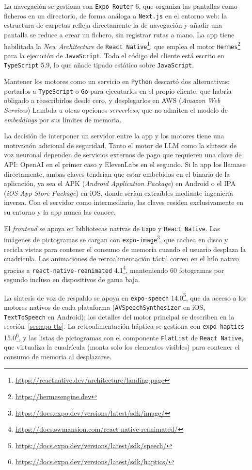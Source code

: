 La navegación se gestiona con \texttt{Expo Router} 6, que organiza las pantallas como ficheros en un directorio, de forma análoga a \texttt{Next.js} en el entorno web: la estructura de carpetas refleja directamente la de navegación y añadir una pantalla se reduce a crear un fichero, sin registrar rutas a mano. La app tiene habilitada la \textit{New Architecture} de \texttt{React Native}\footnote{\url{https://reactnative.dev/architecture/landing-page}}, que emplea el motor \texttt{Hermes}\footnote{\url{https://hermesengine.dev}} para la ejecución de \texttt{JavaScript}. Todo el código del cliente está escrito en \texttt{TypeScript} 5.9, lo que añade tipado estático sobre \texttt{JavaScript}.

Mantener los motores como un servicio en \texttt{Python} descartó dos alternativas: portarlos a \texttt{TypeScript} o \texttt{Go} para ejecutarlos en el propio cliente, que habría obligado a reescribirlos desde cero, y desplegarlos en AWS (\textit{Amazon Web Services}) Lambda u otras opciones \textit{serverless}, que no admiten el modelo de \textit{embeddings} por sus límites de memoria.

La decisión de interponer un servidor entre la app y los motores tiene una motivación adicional de seguridad. Tanto el motor de LLM como la síntesis de voz neuronal dependen de servicios externos de pago que requieren una clave de API: OpenAI en el primer caso y ElevenLabs en el segundo. Si la app los llamase directamente, ambas claves tendrían que estar embebidas en el binario de la aplicación, ya sea el APK (\textit{Android Application Package}) en Android o el IPA (\textit{iOS App Store Package}) en iOS, donde serían extraíbles mediante ingeniería inversa. Con el servidor como intermediario, las claves residen exclusivamente en su entorno y la app nunca las conoce.

El \textit{frontend} se apoya en bibliotecas nativas de \texttt{Expo} y \texttt{React Native}. Las imágenes de pictogramas se cargan con \texttt{expo-image}\footnote{\url{https://docs.expo.dev/versions/latest/sdk/image/}}, que cachea en disco y recicla vistas para contener el consumo de memoria cuando el usuario desplaza la cuadrícula. Las animaciones de retroalimentación táctil corren en el hilo nativo gracias a \texttt{react-native-reanimated} 4.1\footnote{\url{https://docs.swmansion.com/react-native-reanimated/}}, manteniendo 60 fotogramas por segundo incluso en dispositivos de gama baja.

La síntesis de voz de respaldo se apoya en \texttt{expo-speech} 14.0\footnote{\url{https://docs.expo.dev/versions/latest/sdk/speech/}}, que da acceso a los motores nativos de cada plataforma (\texttt{AVSpeechSynthesizer} en iOS, \texttt{TextToSpeech} en Android); los detalles del motor principal se describen en la sección~\ref{sec:app-tts}. La retroalimentación háptica se gestiona con \texttt{expo-haptics} 15.0\footnote{\url{https://docs.expo.dev/versions/latest/sdk/haptics/}}, y las listas de pictogramas con el componente \texttt{FlatList} de \texttt{React Native}, que virtualiza la cuadrícula (monta solo los elementos visibles) para contener el consumo de memoria al desplazarse.

